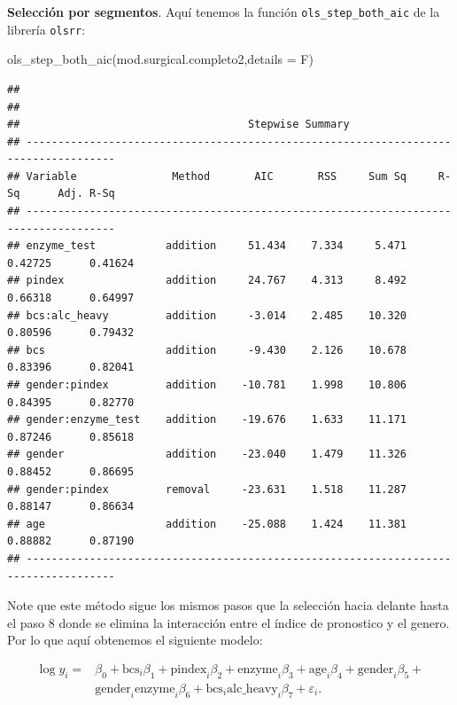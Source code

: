 \documentclass[
]{article}
\newenvironment{Shaded}{\begin{snugshade}}{\end{snugshade}}
\newcommand{\AttributeTok}[1]{\textcolor[rgb]{0.77,0.63,0.00}{#1}}
\newcommand{\FunctionTok}[1]{\textcolor[rgb]{0.00,0.00,0.00}{#1}}
\newcommand{\NormalTok}[1]{#1}
\begin{document}
\textbf{Selección por segmentos}. Aquí tenemos la función \texttt{ols\_step\_both\_aic} de la librería \texttt{olsrr}:

\begin{Shaded}
\begin{Highlighting}[]
\FunctionTok{ols\_step\_both\_aic}\NormalTok{(mod.surgical.completo2,}\AttributeTok{details =}\NormalTok{ F)}
\end{Highlighting}
\end{Shaded}

\begin{verbatim}
## 
## 
##                                    Stepwise Summary                                   
## ------------------------------------------------------------------------------------
## Variable               Method       AIC       RSS     Sum Sq     R-Sq      Adj. R-Sq 
## ------------------------------------------------------------------------------------
## enzyme_test           addition     51.434    7.334     5.471    0.42725      0.41624 
## pindex                addition     24.767    4.313     8.492    0.66318      0.64997 
## bcs:alc_heavy         addition     -3.014    2.485    10.320    0.80596      0.79432 
## bcs                   addition     -9.430    2.126    10.678    0.83396      0.82041 
## gender:pindex         addition    -10.781    1.998    10.806    0.84395      0.82770 
## gender:enzyme_test    addition    -19.676    1.633    11.171    0.87246      0.85618 
## gender                addition    -23.040    1.479    11.326    0.88452      0.86695 
## gender:pindex         removal     -23.631    1.518    11.287    0.88147      0.86634 
## age                   addition    -25.088    1.424    11.381    0.88882      0.87190 
## ------------------------------------------------------------------------------------
\end{verbatim}

Note que este método sigue los mismos pasos que la selección hacia delante hasta el paso 8 donde se elimina la interacción entre el índice de pronostico y el genero. Por lo que aquí obtenemos el siguiente modelo:

\begin{equation}
\begin{split}
\log y_{i} =& \beta_{0} + \mbox{bcs}_{i}\beta_{1} + \mbox{pindex}_{i}\beta_{2} + \mbox{enzyme}_{i}\beta_{3} + \mbox{age}_{i}\beta_{4} + \mbox{gender}_{i}\beta_{5} + \\
& \mbox{gender}_{i}\mbox{enzyme}_{i}\beta_{6} + \mbox{bcs}_{i}\mbox{alc_heavy}_{i}\beta_{7} + \varepsilon_{i}.
\end{split}
\nonumber
\end{equation}
\end{document}
